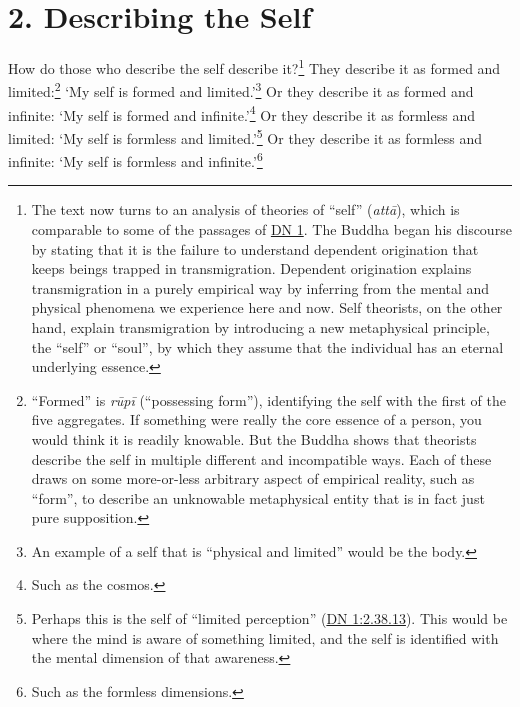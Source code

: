 \documentclass[12pt,openany]{book}%
\begin{document}
\section*{2. Describing the Self }

How do those who describe the self describe it?\footnote{The text now turns to an analysis of theories of “self” (\textit{\textsanskrit{attā}}), which is comparable to some of the passages of \href{https://suttacentral.net/dn1/en/sujato}{DN 1}. The Buddha began his discourse by stating that it is the failure to understand dependent origination that keeps beings trapped in transmigration. Dependent origination explains transmigration in a purely empirical way by inferring from the mental and physical phenomena we experience here and now. Self theorists, on the other hand, explain transmigration by introducing a new metaphysical principle, the “self” or “soul”, by which they assume that the individual has an eternal underlying essence. } They describe it as formed and limited:\footnote{“Formed” is \textit{\textsanskrit{rūpī}} (“possessing form”), identifying the self with the first of the five aggregates. If something were really the core essence of a person, you would think it is readily knowable. But the Buddha shows that theorists describe the self in multiple different and incompatible ways. Each of these draws on some more-or-less arbitrary aspect of empirical reality, such as “form”, to describe an unknowable metaphysical entity that is in fact just pure supposition. } ‘My self is formed and limited.’\footnote{An example of a self that is “physical and limited” would be the body. } Or they describe it as formed and infinite: ‘My self is formed and infinite.’\footnote{Such as the cosmos. } Or they describe it as formless and limited: ‘My self is formless and limited.’\footnote{Perhaps this is the self of “limited perception” (\href{https://suttacentral.net/dn1/en/sujato\#2.38.13}{DN 1:2.38.13}). This would be where the mind is aware of something limited, and the self is identified with the mental dimension of that awareness. } Or they describe it as formless and infinite: ‘My self is formless and infinite.’\footnote{Such as the formless dimensions. } 
\end{document}
